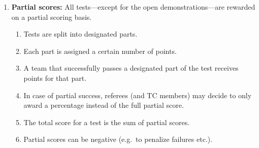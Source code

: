 \begin{enumerate}
	\item \textbf{Partial scores:} All tests---except for the open demonstrations---are rewarded on a partial scoring basis. 
	\begin{enumerate}
		\item Tests are split into designated parts.
		\item Each part is assigned a certain number of points.
		\item A team that successfully passes a designated part of the test receives points for that part.
		\item In case of partial success, referees (and TC members) may decide to only award a percentage instead of the full partial score.  
		\item The total score for a test is the sum of partial scores.
		\item Partial scores can be negative (e.g.~to penalize failures etc.).
	\end{enumerate}
\end{enumerate}


